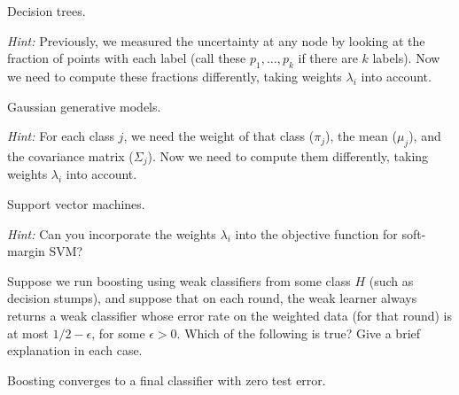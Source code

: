 \documentclass{article}
\begin{document}
\begin{probset}
\begin{prob}
    \begin{subprobset}
    \begin{subprob}
        Decision trees.

        \textit{Hint:} Previously, we measured the uncertainty at any node by looking at the fraction of points with each label (call these $p_1, \ldots, p_k$ if there are $k$ labels). Now we need to compute these fractions differently, taking weights $\lambda_i$ into account.

        \begin{soln}

        \end{soln}
    \end{subprob}

    \begin{subprob}
        Gaussian generative models.

        \textit{Hint:} For each class $j$, we need the weight of that class ($\pi_j$), the mean ($\mu_j$), and the covariance matrix ($\Sigma_j$). Now we need to compute them differently, taking weights $\lambda_i$ into account.

        \begin{soln}

        \end{soln}
    \end{subprob}

    \begin{subprob}
        Support vector machines.

        \textit{Hint:} Can you incorporate the weights $\lambda_i$ into the objective function for soft-margin SVM?

        \begin{soln}

        \end{soln}
    \end{subprob}
    \end{subprobset}
\end{prob}

\begin{prob}
    Suppose we run boosting using weak classifiers from some class $H$ (such as decision stumps), and suppose that on each round, the weak learner always returns a weak classifier whose error rate on the weighted data (for that round) is at most $1/2 - \epsilon$, for some $\epsilon > 0$. Which of the following is true? Give a brief explanation in each case.

    \begin{subprobset}
    \begin{subprob}
        Boosting converges to a final classifier with zero test error.


\end{subprob}
\end{subprobset}
\end{prob}
\end{probset}
\end{document}
